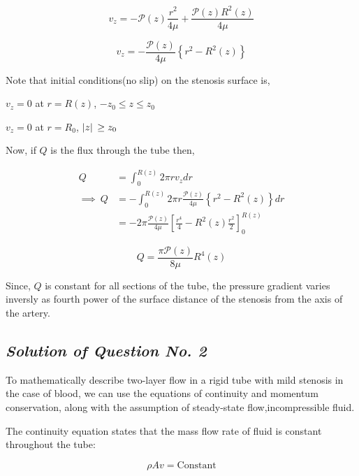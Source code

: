 \documentclass[12pt, a4paper]{article} %
\begin{document}
\begin{equation*}
    v_z = -\mathcal{P}(z)\frac{r^2}{4 \mu} + \frac{\mathcal{P}(z) R^2(z)}{4 \mu}
\end{equation*}

\begin{equation*}
    \boxed{v_z = -\frac{\mathcal{P}(z)}{4 \mu} \left\{r^2 - R^2(z)\right\}}
\end{equation*}

Note that initial conditions(no slip) on the stenosis surface is,

$v_z = 0$ at $r = R(z)$, $-z_0 \leq z \leq z_0$

$v_z = 0$ at $r = R_0$, $\abs*{z}\geq z_0$

Now, if $Q$ is the flux through the tube then,

\begin{equation*}
    \begin{split}
        Q & = \int_{0}^{R(z)} 2\pi r v_z dr\\[4mm]
        \implies\ Q & = -\int_{0}^{R(z)} 2\pi r \frac{\mathcal{P}(z)}{4 \mu} \left\{r^2 - R^2(z)\right\}dr\\[4mm]
        & = -2 \pi  \frac{\mathcal{P}(z)}{4 \mu}\left[\frac{r^4}{4}-R^2(z)\frac{r^2}{2}\right]_{0}^{R(z)}
    \end{split}
\end{equation*}

\begin{equation*}
    \boxed{Q = \frac{\pi \mathcal{P}(z)}{8 \mu} R^4(z)}
\end{equation*}

Since, $Q$ is constant for all sections of the tube, the pressure gradient varies inversly as fourth power of the surface distance of the stenosis from the axis of the artery.
 
\pagebreak

\subsection{\slshape Solution of Question No. 2}

To mathematically describe two-layer flow in a rigid tube with mild stenosis in the case of blood, we can use the equations of continuity and momentum conservation, along with the assumption of steady-state flow,incompressible fluid.

The continuity equation states that the mass flow rate of fluid is constant throughout the tube:

\begin{equation*}
    \rho A v = \mbox{Constant}
\end{equation*}
\end{document}
